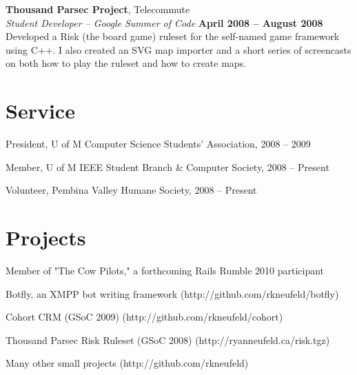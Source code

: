 \documentclass[margin,line,letterpaper]{resume}
\begin{document}
\begin{resume}
{\bf Thousand Parsec Project}, Telecommute \vspace{2mm}\\\vspace{1mm}%
  {\sl Student Developer --  Google Summer of Code } \hfill {\bf April 2008 -- August 2008}\\
  Developed a Risk (the board game) ruleset for the self-named game framework using C++. I also created an SVG map importer and a short series of screencasts on both how to play the ruleset and how to create maps.

  \section{\mysidestyle Service}

  \begin{list2}
    \item President, U of M Computer Science Students' Association, 2008 -- 2009
    \item Member, U of M IEEE Student Branch \& Computer Society, 2008 -- Present
    \item Volunteer, Pembina Valley Humane Society, 2008 -- Present
  \end{list2}

  \section{\mysidestyle Projects}

  \begin{list2}
    \item Member of "The Cow Pilots," a forthcoming Rails Rumble 2010 participant
    \item Botfly, an XMPP bot writing framework (http://github.com/rkneufeld/botfly)
    \item Cohort CRM (GSoC 2009) (http://github.com/rkneufeld/cohort)
    \item Thousand Parsec Risk Ruleset (GSoC 2008) (http://ryanneufeld.ca/risk.tgz)
    \item Many other small projects (http://github.com/rkneufeld)
  \end{list2}


\end{resume}
\end{document}
